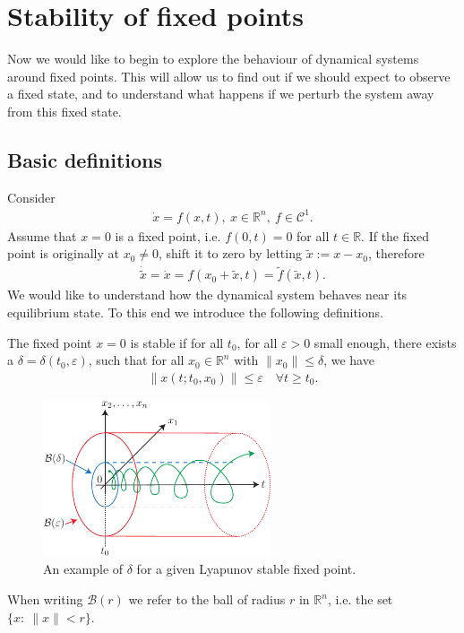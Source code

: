 \chapter{Stability of fixed points}
Now we would like to begin to explore the behaviour of dynamical systems around fixed points. This will allow us to find out if we should expect to observe a fixed state, and to understand what happens if we perturb the system away from this fixed state.
\section{Basic definitions}
Consider
\begin{align}
	\dot{ {x}}=f( {x},t),\  {x} \in \mathbb{R}^{n},\ f\in \mathcal{C}^{1}.
\end{align}
Assume that $ {x}=0$ is a fixed point, i.e. $f({0},t) = {0}$ for all $t \in \mathbb{R}$. If the fixed point is originally at ${x}_0\neq {0}$, shift it to zero by letting $\tilde{ {x}}:= {x}- {x}_0$, therefore 
\begin{align}
	\dot{\tilde{ {x}}} = \dot{ {x}} = f( {x}_0 + \tilde{ {x}}, t) = \tilde{f}(\tilde{ {x}}, t).
\end{align}
We would like to understand how the dynamical system behaves near its equilibrium state. To this end we introduce the following definitions.
\begin{definition} \label{def:stable}
	The fixed point $ {x}={0}$ is stable if for all $t_0$, for all $\varepsilon>0$ small enough, there exists a $\delta=\delta(t_0, \varepsilon)$, such that for all $ {x}_0 \in \mathbb{R}^{n}$ with $\| {x}_0\| \leq \delta$, we have 
	\begin{align}
		\boxed{
			\left \|  {x}(t;t_0,  {x}_0) \right\| \leq \varepsilon \quad \forall t \geq t_0.
		}
	\end{align}
\begin{figure}[h!]
	\centering
	\includegraphics[width=0.6\textwidth]{figures/ch2/1lyapunov_stability.pdf}
	\caption{An example of $\delta$ for a given Lyapunov stable fixed point.}
	\label{fig:lyapunov_stability_def}
\end{figure}
\end{definition}
\begin{remark}
	When writing $\mathcal{B}(r)$ we refer to the ball of radius $r$ in $\mathbb{R}^{n}$, i.e. the set $\{x:\ \|x\| < r\}$.
\end{remark}

